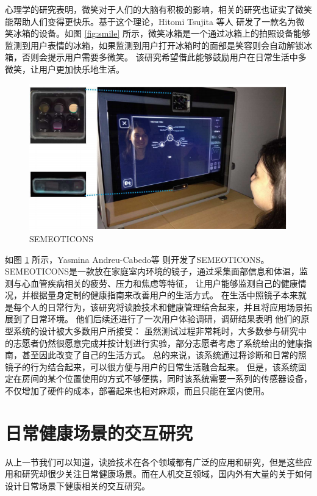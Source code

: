 心理学的研究表明，微笑对于人们的大脑有积极的影响\cite{williamarticle}，相关的研究也证实了微笑能帮助人们变得更快乐。基于这个理论，Hitomi Tsujita 等人\cite{Tsujita2011Smiling} 研发了一款名为微笑冰箱的设备。如图 \ref{fig:smile} 所示，微笑冰箱是一个通过冰箱上的拍照设备能够监测到用户表情的冰箱，如果监测到用户打开冰箱时的面部是笑容则会自动解锁冰箱，否则会提示用户需要多微笑。
该研究希望借此能够鼓励用户在日常生活中多微笑，让用户更加快乐地生活。 

\begin{figure}[h]
    \centering
    \includegraphics[width=12cm]{images/mirror.png}
    \caption{SEMEOTICONS}
    \label{fig:seme}
\end{figure}

如图 \ref{fig:seme} 所示，Yasmina Andreu-Cabedo等  \cite{andreu2015mirror}则开发了SEMEOTICONS。
SEMEOTICONS是一款放在家庭室内环境的镜子，通过采集面部信息和体温，监测与心血管疾病相关的疲劳、压力和焦虑等特征， 让用户能够监测自己的健康情况，并根据量身定制的健康指南来改善用户的生活方式。
在生活中照镜子本来就是每个人的日常行为，该研究将读脸技术和健康管理结合起来，并且将应用场景拓展到了日常环境。
他们后续还进行了一次用户体验调研，调研结果表明\cite{coppini2017user} 他们的原型系统的设计被大多数用户所接受： 虽然测试过程非常耗时，大多数参与研究中的志愿者仍然很愿意完成并按计划进行实验，部分志愿者考虑了系统给出的健康指南，甚至因此改变了自己的生活方式。
总的来说，该系统通过将诊断和日常的照镜子的行为结合起来，可以很方便与用户的日常生活融合起来。
但是，该系统固定在房间的某个位置使用的方式不够便携，同时该系统需要一系列的传感器设备，不仅增加了硬件的成本，部署起来也相对麻烦，而且只能在室内使用。

\section{日常健康场景的交互研究}

从上一节我们可以知道，读脸技术在各个领域都有广泛的应用和研究，但是这些应用和研究却很少关注日常健康场景。而在人机交互领域，国内外有大量的关于如何设计日常场景下健康相关的交互研究。

